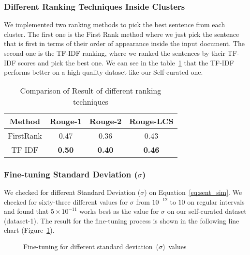 \subsubsection{Different Ranking Techniques Inside Clusters}\label{subsubsec:different-ranking-techniques-inside-clusters}
We implemented two ranking methods to pick the best sentence from each cluster.
The first one is the First Rank method where we just pick the sentence that is first in terms of their order of
appearance inside the input document.
The second one is the TF-IDF ranking, where we ranked the sentences by their TF-IDF scores and pick the best one.
We can see in the table~\ref{tab:ranking} that the TF-IDF performs
better on a high quality dataset like our Self-curated one.\\

\begin{table}
    \centering
    \begin{tabular}{cccc}\hline
        Method      & Rouge-1       & Rouge-2       & Rouge-LCS     \\\hline
        FirstRank   & 0.47          & 0.36          & 0.43          \\
        TF-IDF      & \textbf{0.50} & \textbf{0.40} & \textbf{0.46} \\\hline
    \end{tabular}
    \caption{Comparison of Result of different ranking techniques}
    \label{tab:ranking}
\end{table}


\subsubsection{Fine-tuning Standard Deviation ($\sigma$)}\label{subsubsec:sigma}
We checked for different Standard Deviation ($\sigma$) on Equation~\ref{eq:sent_sim}.
We checked for sixty-three different values for $\sigma$ from $10^{-12}$ to $10$ on regular intervals
and found that $5\times10^{-11}$ works best as the value for $\sigma$ on our self-curated dataset (dataset-1).
The result for the fine-tuning process is shown in the following line chart (Figure~\ref{fig:sigma-fine-tuning}).\\

\begin{figure}
    \centering
    
    \caption{Fine-tuning for different standard deviation~($\sigma$)~values}
    \label{fig:sigma-fine-tuning}
\end{figure}


